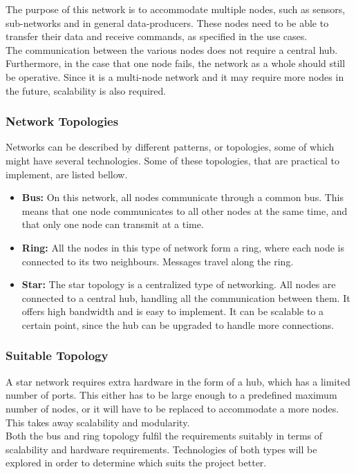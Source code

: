 The purpose of this network is to accommodate multiple nodes, such as sensors, sub-networks and in general data-producers.
These nodes need to be able to transfer their data and receive commands, as specified in the use cases.
\\
The communication between the various nodes does not require a central hub.
Furthermore, in the case that one node fails, the network as a whole should still be operative.
Since it is a multi-node network and it may require more nodes in the future, scalability is also required.

\subsubsection*{Network Topologies}
Networks can be described by different patterns, or topologies, some of which might have several technologies.
Some of these topologies, that are practical to implement, are listed bellow.
\begin{itemize}
\item \textbf{Bus:}
On this network, all nodes communicate through a common bus. 
This means that one node communicates to all other nodes at the same time, and that only one node can transmit at a time.
\item \textbf{Ring:} All the nodes in this type of network form a ring, where each node is connected to its two neighbours.
Messages travel along the ring.
\item \textbf{Star:} The star topology is a centralized type of networking.
All nodes are connected to a central hub, handling all the communication between them.
It offers high bandwidth and is easy to implement.
It can be scalable to a certain point, since the hub can be upgraded to handle more connections.
\end{itemize}

\subsubsection*{Suitable Topology}
A star network requires extra hardware in the form of a hub, which has a limited number of ports. 
This either has to be large enough to a predefined maximum number of nodes, or it will have to be replaced to accommodate a more nodes.
This takes away scalability and modularity.\\

Both the bus and ring topology fulfil the requirements suitably in terms of scalability and hardware requirements.
Technologies of both types will be explored in order to determine which suits the project better.

